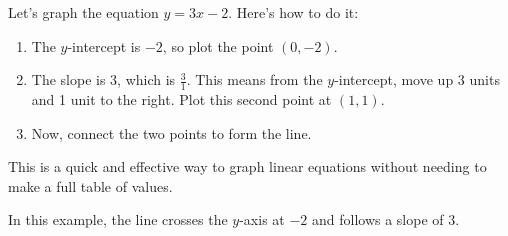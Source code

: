 \documentclass[12pt]{article}
\begin{document}
Let's graph the equation \( y = 3x - 2 \). Here's how to do it:

\begin{enumerate}
  \item The $y$-intercept is $-2$, so plot the point $(0, -2)$.
  \item The slope is $3$, which is $\frac{3}{1}$. This means from the
        $y$-intercept, move up 3 units and 1 unit to the right. Plot this second
        point at $(1, 1)$.
  \item Now, connect the two points to form the line.
\end{enumerate}

This is a quick and effective way to graph linear equations without needing to
make a full table of values.

\begin{center}
\end{center}

In this example, the line crosses the $y$-axis at $-2$ and follows a slope of
$3$.
\end{document}
